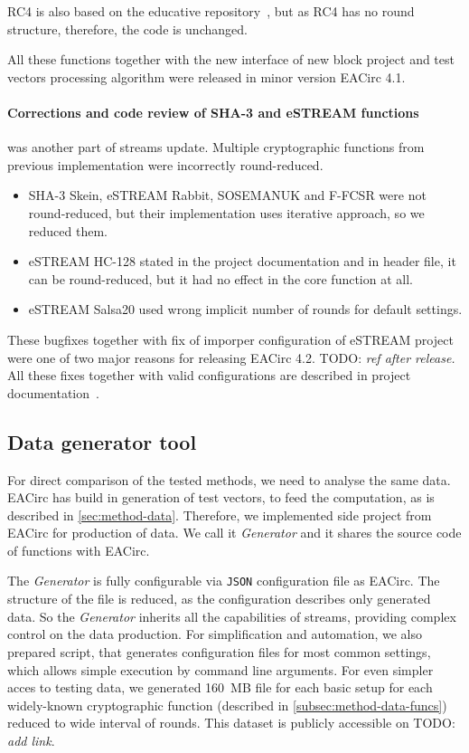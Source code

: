 \documentclass[
  print, %
  Table,   %
  nolof,     %
  nolot,     %
  11pt, %
  oneside  %
]{fithesis3}
\newcommand{\todo}[1]{TODO: \textit{#1}}
\begin{document}
RC4 is also based on the educative repository~\cite{cryptoFunc}, but as RC4 has no round structure, therefore, the code is unchanged.

All these functions together with the new interface of new block project and test vectors processing algorithm were released in minor version EACirc 4.1.

\paragraph{Corrections and code review of SHA-3 and eSTREAM functions} was another part of streams update. Multiple cryptographic functions from previous implementation were incorrectly round-reduced.
\label{par:method-data-funcs-bugs}

\begin{itemize}
    \item SHA-3 Skein, eSTREAM Rabbit, SOSEMANUK and F-FCSR were not round-reduced, but their implementation uses iterative approach, so we reduced them.
    \item eSTREAM HC-128 stated in the project documentation and in header file, it can be round-reduced, but it had no effect in the core function at all.
    \item eSTREAM Salsa20 used wrong implicit number of rounds for default settings.
\end{itemize}

These bugfixes together with fix of imporper configuration of eSTREAM project were one of two major reasons for releasing EACirc 4.2. \todo{ref after release.} All these fixes together with valid configurations are described in project documentation~\cite{EACirc-wiki-streams}.

\subsection{Data generator tool}
\label{subsec:method-data-generator}

For direct comparison of the tested methods, we need to analyse the same data. EACirc has build in generation of test vectors, to feed the computation, as is described in \cref{sec:method-data}. Therefore, we implemented side project from EACirc for production of data. We call it \textit{Generator} and it shares the source code of functions with EACirc.

The \textit{Generator} is fully configurable via \texttt{JSON} configuration file as EACirc. The structure of the file is reduced, as the configuration describes only generated data. So the \textit{Generator} inherits all the capabilities of streams, providing complex control on the data production. For simplification and automation, we also prepared script, that generates configuration files for most common settings, which allows simple execution by command line arguments. For even simpler acces to testing data, we generated 160~MB file for each basic setup for each widely-known cryptographic function (described in \cref{subsec:method-data-funcs}) reduced to wide interval of rounds. This dataset is publicly accessible on \todo{add link}.
\end{document}
